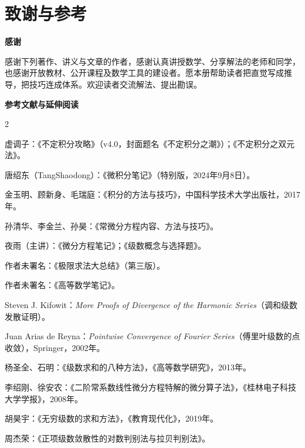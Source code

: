 \chapter{致谢与参考}
\label{front:acknowledgements}
\vspace{-4mm}
\noindent{\color{CoverTeal}\rule{\linewidth}{1.2pt}}

\noindent\textbf{\large\color{Teal}感谢}

感谢下列著作、讲义与文章的作者，感谢认真讲授数学、分享解法的老师和同学，也感谢开放教材、公开课程及数学工具的建设者。愿本册帮助读者把直觉写成推导，把技巧连成体系。欢迎读者交流解法、提出勘误。

\smallskip
\noindent\textbf{\large\color{Teal}参考文献与延伸阅读}
\par\smallskip
{\setlength{\columnsep}{7mm}\setlength{\multicolsep}{0pt}
\begin{multicols}{2}
\fontsize{9.3}{12.5}\selectfont
\setlength{\parskip}{0pt}
\begin{enumerate}[label=\textcolor{Teal}{[\arabic*]},leftmargin=2.2em,itemsep=2pt,topsep=1pt,parsep=0pt]
\item 虚调子：《不定积分攻略》（v4.0，封面题名《不定积分之潮》）；《不定积分之双元法》。
\item 唐绍东（TangShaodong）：《微积分笔记》（特别版，2024年9月8日）。
\item 金玉明、顾新身、毛瑞庭：《积分的方法与技巧》，中国科学技术大学出版社，2017年。
\item 孙清华、李金兰、孙昊：《常微分方程内容、方法与技巧》。
\item 夜雨（主讲）：《微分方程笔记》；《级数概念与选择题》。
\item 作者未署名：《极限求法大总结》（第三版）。
\item 作者未署名：《高等数学笔记》。
\item Steven J. Kifowit：\textit{More Proofs of Divergence of the Harmonic Series}（调和级数发散证明）。
\item Juan Arias de Reyna：\textit{Pointwise Convergence of Fourier Series}（傅里叶级数的点收敛），Springer，2002年。
\item 杨圣全、石明：《级数求和的八种方法》，《高等数学研究》，2013年。
\item 李绍刚、徐安农：《二阶常系数线性微分方程特解的微分算子法》，《桂林电子科技大学学报》，2008年。
\item 胡昊宇：《无穷级数的求和方法》，《教育现代化》，2019年。
\item 周杰荣：《正项级数敛散性的对数判别法与拉贝判别法》。

\end{enumerate}
\end{multicols}}
